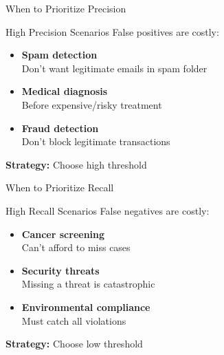 \documentclass{beamer}
\begin{document}
\begin{frame}{When to Prioritize Precision}
\begin{examplebox}{High Precision Scenarios}
\small
False positives are costly:
\end{examplebox}

\vspace{0.15cm}

\begin{itemize}
    \item \textbf{Spam detection} \\
          Don't want legitimate emails in spam folder

    \item \textbf{Medical diagnosis} \\
          Before expensive/risky treatment

    \item \textbf{Fraud detection} \\
          Don't block legitimate transactions
\end{itemize}

\vspace{0.15cm}

\begin{center}
\textbf{Strategy:} Choose high threshold
\end{center}
\end{frame}

\begin{frame}{When to Prioritize Recall}
\begin{examplebox}{High Recall Scenarios}
\small
False negatives are costly:
\end{examplebox}

\vspace{0.15cm}

\begin{itemize}
    \item \textbf{Cancer screening} \\
          Can't afford to miss cases

    \item \textbf{Security threats} \\
          Missing a threat is catastrophic

    \item \textbf{Environmental compliance} \\
          Must catch all violations
\end{itemize}

\vspace{0.15cm}

\begin{center}
\textbf{Strategy:} Choose low threshold
\end{center}
\end{frame}
\end{document}
